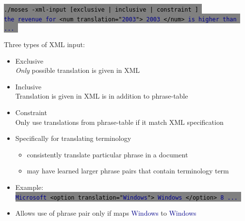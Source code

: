 \documentclass[landscape]{uedslides2C}
\newcommand{\example}[1]{\textcolor{darkblue}{\rm #1}}
\newcommand{\littlecode}[1]{\colorbox{gray}{\textcolor{black}{\small \tt #1}}}
\begin{document}


\littlecode{./moses -xml-input [exclusive | inclusive | constraint ] }
\\
\littlecode{\example{the revenue for} <num translation="\example{2003}"> \example{2003}
  </num> \example{is higher than ...} }

\vspace{1cm}
Three types of XML input:
\vspace{-2mm}
\begin{itemize} \itemsep -2mm 
  \item Exclusive \\
    \emph{Only} possible translation is given in XML 
  \item Inclusive \\
  Translation is given in XML is in addition to phrase-table
  \item Constraint \\
  Only use translations from phrase-table if it match XML specification
\end{itemize}


\vspace{1cm}
\begin{itemize}
\item Specifically for translating terminology
\begin{itemize} 
  \item consistently translate particular phrase in a document
  \item may have learned larger phrase pairs that contain terminology term
\end{itemize} 

\item Example: \\[4mm]
\littlecode{\example{Microsoft} <option translation="\example{Windows}"> \example{Windows}
  </option> \example{8 ...} }

\item Allows use of phrase pair only if maps \example{Windows} to  \example{Windows}
\end{itemize}

\end{document}
